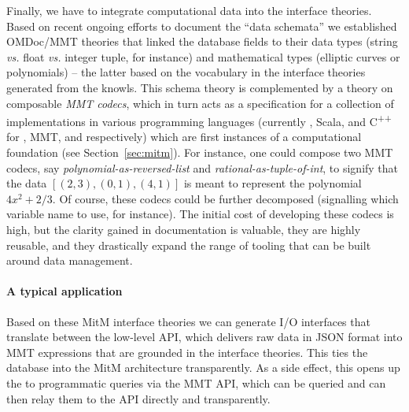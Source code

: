 Finally, we have to integrate computational data into the interface theories. Based on
recent ongoing efforts \cite{lmfdb-formats} to document the \LMFDB ``data schemata'' we
established OMDoc/MMT theories that linked the database fields to their data types (string
\emph{vs.} float \emph{vs.} integer tuple, for instance) and mathematical types (elliptic
curves or polynomials) -- the latter based on the vocabulary in the interface theories
generated from the \LMFDB knowls. This schema theory is complemented by a theory on
composable \emph{MMT codecs}, which in turn acts as a specification for a collection of
implementations in various programming languages (currently \Python, Scala, and
C\textsuperscript{++} for \Sage, MMT, and \GAP respectively) which are first instances of
a computational foundation (see Section~\ref{sec:mitm}).  For instance, one could compose
two MMT codecs, say \emph{polynomial-as-reversed-list} and
\emph{rational-as-tuple-of-int}, to signify that the data $[(2,3),(0,1),(4,1)]$ is meant
to represent the polynomial $4x^2+2/3$. Of course, these codecs could be further
decomposed (signalling which variable name to use, for instance). The initial cost of
developing these codecs is high, but the clarity gained in documentation is valuable, they
are highly reusable, and they drastically expand the range of tooling that can be built
around data management.

\paragraph{A typical application}
Based on these MitM interface theories we can generate I/O interfaces that translate
between the low-level \LMFDB API, which delivers raw \Mongo data in JSON format into MMT
expressions that are grounded in the interface theories. This ties the \LMFDB database
into the MitM architecture transparently. As a side effect, this opens up the \LMFDB to
programmatic queries via the MMT API, which can be queried and can then relay them to the
\LMFDB API directly and transparently.


